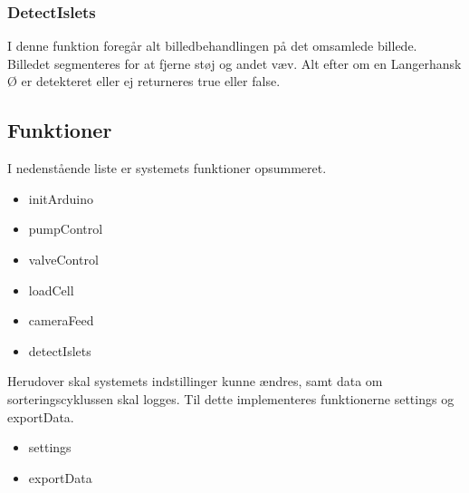 \subsubsection{DetectIslets}
I denne funktion foregår alt billedbehandlingen på det omsamlede billede. Billedet segmenteres for at fjerne støj og andet væv. Alt efter om en Langerhansk Ø er detekteret eller ej returneres true eller false. 

\newpage
\subsection{Funktioner}
I nedenstående liste er systemets funktioner opsummeret. 
\begin{itemize}
\item initArduino
\item pumpControl 
\item valveControl 
\item loadCell 
\item cameraFeed 
\item detectIslets 
\end{itemize}
Herudover skal systemets indstillinger kunne ændres, samt data om sorteringscyklussen skal logges. Til dette implementeres funktionerne settings og exportData.
\begin{itemize}
\item settings 
\item exportData 
\end{itemize}

\newpage







